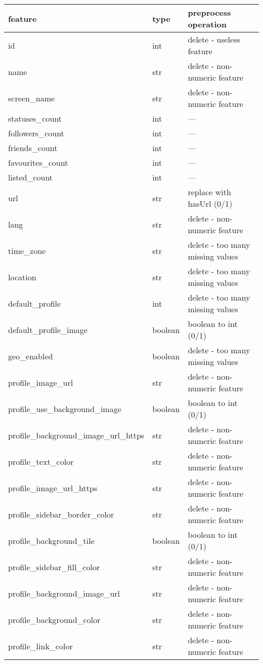 \begin{center}
	\begin{tabular}{lll}
		\\feature&type&preprocess operation\\
		\hline\hline
		id&int&delete - useless feature\\
		name&str&delete - non-numeric feature\\
		screen\_name&str&delete - non-numeric feature\\
		statuses\_count&int&---\\
		followers\_count&int&---\\
		friends\_count&int&---\\
		favourites\_count&int&---\\
		listed\_count&int&---\\
		url&str&replace with hasUrl (0/1)\\
		lang&str&delete - non-numeric feature\\
		time\_zone&str&delete - too many missing values\\
		location&str&delete - too many missing values\\
		default\_profile&int&delete - too many missing values\\
		default\_profile\_image&boolean&boolean to int (0/1)\\
		geo\_enabled&boolean&delete - too many missing values\\
		profile\_image\_url&str&delete - non-numeric feature\\
		profile\_use\_background\_image&boolean&boolean to int (0/1)\\
		profile\_background\_image\_url\_https&str&delete - non-numeric feature\\
		profile\_text\_color&str&delete - non-numeric feature\\
		profile\_image\_url\_https&str&delete - non-numeric feature\\
		profile\_sidebar\_border\_color&str&delete - non-numeric feature\\
		profile\_background\_tile&boolean&boolean to int (0/1)\\
		profile\_sidebar\_fill\_color&str&delete - non-numeric feature\\
		profile\_background\_image\_url&str&delete - non-numeric feature\\
		profile\_background\_color&str&delete - non-numeric feature\\
		profile\_link\_color&str&delete - non-numeric feature\\

\end{tabular}
\end{center}

